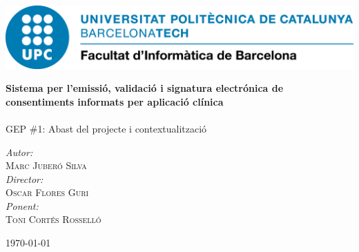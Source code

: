 \begin{titlepage}
\center

\includegraphics[scale=0.4]{img/UPC-FIB.png}
\vspace{2cm}


{\huge \bfseries Sistema per l'emissió, validació i signatura electrónica de consentiments informats per aplicació clínica}\\[0.4cm]
\HRule \\[0.2cm]


\Large GEP \#1: Abast del projecte i contextualització

\vspace{8cm}

\emph{Autor:}\\ \large
 \textsc{Marc Juberó Silva}\\
\vspace{0.5cm}
\emph{Director:}\\ \large
 \textsc{Oscar Flores Guri}\\
\vspace{0.5cm}
\emph{Ponent:}\\ \large
 \textsc{Toni Cortés Rosselló}\\

\vspace{1cm}


{\large \today}\\[1cm] %

\vfill
\end{titlepage}